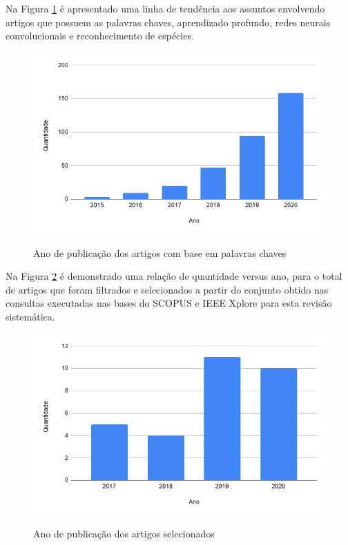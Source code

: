 \documentclass[
	12pt,				%
	oneside,			%
	a4paper,			%
	english,			%
	brazil				%
	]{abntex2ppgsi}
\begin{document}
Na Figura \ref{fig:grafico_ano_vs_quantidade} é apresentado uma linha de tendência aos assuntos envolvendo artigos que possuem as palavras chaves, aprendizado profundo, redes neurais convolucionais e reconhecimento de espécies.

\begin{figure}[H]
    \centering
    \caption{Ano de publicação dos artigos com base em palavras chaves}
    \includegraphics[scale=.60]{imagens/revisao_sistematica/grafico_ano_vs_quantidade.png}
    \label{fig:grafico_ano_vs_quantidade}
\end{figure}

Na Figura \ref{fig:grafico_ano_vs_publicacao} é demonstrado uma relação de quantidade versus ano, para o total de artigos que foram filtrados e selecionados a partir do conjunto obtido nas consultas executadas nas bases do SCOPUS e IEEE Xplore para esta revisão sistemática.

\begin{figure}[H]
    \centering
    \caption{Ano de publicação dos artigos selecionados}
    \includegraphics[scale=.60]{imagens/revisao_sistematica/grafico_ano_vs_publicacao.png}
    \label{fig:grafico_ano_vs_publicacao}
\end{figure}
\end{document}
